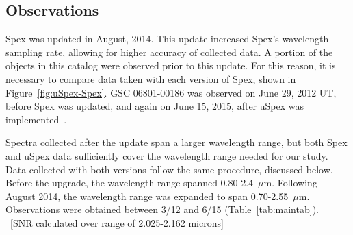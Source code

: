\subsection{Observations}

Spex was updated in August, 2014.  This update increased Spex's wavelength sampling rate, allowing for higher accuracy of collected data.  
A portion of the objects in this catalog were observed prior to this update.  For this reason, it is necessary to compare data taken with each version of Spex, shown in Figure~\ref{fig:uSpex-Spex}.  
GSC 06801-00186 was observed on June 29, 2012 UT, before Spex was updated, and again on June 15, 2015, after uSpex was implemented~\cite{Spextool_Manual_Cushing_2015}.  %

Spectra collected after the update span a larger wavelength range, but both Spex and uSpex data sufficiently cover the wavelength range needed for our study.  
Data collected with both versions follow the same procedure, discussed below.  Before the upgrade, the wavelength range spanned 0.80-2.4~$\mu$m.  Following August 2014, the wavelength range was expanded to span 0.70-2.55~$\mu$m.  Observations were obtained between 3/12 and 6/15 (Table~\ref{tab:maintab}).\\



~[SNR calculated over range of 2.025-2.162 microns]\\




